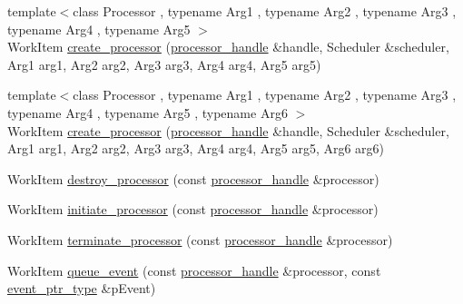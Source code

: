 \begin{DoxyCompactItemize}
\item 
{\footnotesize template$<$class Processor , typename Arg1 , typename Arg2 , typename Arg3 , typename Arg4 , typename Arg5 $>$ }\\Work\+Item \mbox{\hyperlink{classboost_1_1statechart_1_1processor__container_a0a00d34bbc4ec1fecab618ad9150ddea}{create\+\_\+processor}} (\mbox{\hyperlink{classboost_1_1statechart_1_1processor__container_a82ebbffaed81d7b99119ae0e892f6411}{processor\+\_\+handle}} \&handle, Scheduler \&scheduler, Arg1 arg1, Arg2 arg2, Arg3 arg3, Arg4 arg4, Arg5 arg5)
\item 
{\footnotesize template$<$class Processor , typename Arg1 , typename Arg2 , typename Arg3 , typename Arg4 , typename Arg5 , typename Arg6 $>$ }\\Work\+Item \mbox{\hyperlink{classboost_1_1statechart_1_1processor__container_afad33654a40929162fb4e10c9a9bc73b}{create\+\_\+processor}} (\mbox{\hyperlink{classboost_1_1statechart_1_1processor__container_a82ebbffaed81d7b99119ae0e892f6411}{processor\+\_\+handle}} \&handle, Scheduler \&scheduler, Arg1 arg1, Arg2 arg2, Arg3 arg3, Arg4 arg4, Arg5 arg5, Arg6 arg6)
\item 
Work\+Item \mbox{\hyperlink{classboost_1_1statechart_1_1processor__container_aa6a671334e57fdb6b99946907c292cb6}{destroy\+\_\+processor}} (const \mbox{\hyperlink{classboost_1_1statechart_1_1processor__container_a82ebbffaed81d7b99119ae0e892f6411}{processor\+\_\+handle}} \&processor)
\item 
Work\+Item \mbox{\hyperlink{classboost_1_1statechart_1_1processor__container_a605121c8af1bd1ab65cb65531da0cac8}{initiate\+\_\+processor}} (const \mbox{\hyperlink{classboost_1_1statechart_1_1processor__container_a82ebbffaed81d7b99119ae0e892f6411}{processor\+\_\+handle}} \&processor)
\item 
Work\+Item \mbox{\hyperlink{classboost_1_1statechart_1_1processor__container_aaf9ad46333b3d8f490769788ced131a2}{terminate\+\_\+processor}} (const \mbox{\hyperlink{classboost_1_1statechart_1_1processor__container_a82ebbffaed81d7b99119ae0e892f6411}{processor\+\_\+handle}} \&processor)
\item 
Work\+Item \mbox{\hyperlink{classboost_1_1statechart_1_1processor__container_af734be4c5c3d87830dae2cbb08c9223e}{queue\+\_\+event}} (const \mbox{\hyperlink{classboost_1_1statechart_1_1processor__container_a82ebbffaed81d7b99119ae0e892f6411}{processor\+\_\+handle}} \&processor, const \mbox{\hyperlink{classboost_1_1statechart_1_1processor__container_a0123b4f1061816fce5aa2c2ec4c06934}{event\+\_\+ptr\+\_\+type}} \&p\+Event)
\end{DoxyCompactItemize}
